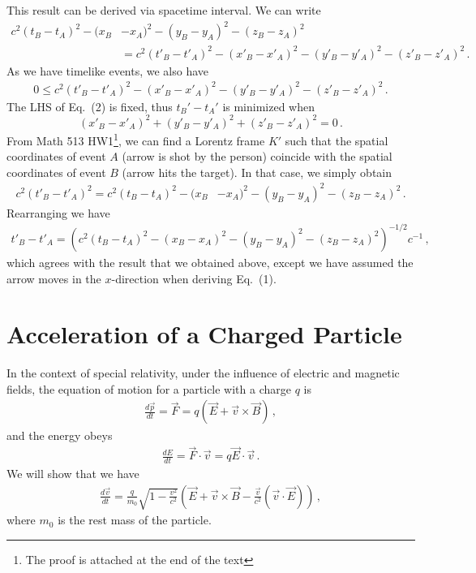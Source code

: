 \documentclass[11pt, onesided]{book}
\theoremstyle{break}
\theoremstyle{break}
\begin{document}
This result can be derived via spacetime interval. We can write
\begin{align*}
c^2(t_B-t_A)^2 - (x_B&-x_A)^2 - (y_B-y_A)^2 - (z_B-z_A)^2 \\
&= 
c^2(t'_B-t'_A)^2 - (x'_B-x'_A)^2 - (y'_B-y'_A)^2 - (z'_B-z'_A)^2\,. \tag{2}
\end{align*}
\setcounter{equation}{2}
As we have timelike events, we also have
\begin{align*}
0 \leq c^2(t'_B-t'_A)^2 - (x'_B-x'_A)^2 - (y'_B-y'_A)^2 - (z'_B-z'_A)^2\,.
\end{align*}
The LHS of Eq.\ (2) is fixed, thus $t_B' - t_A'$ is minimized when 
$$(x'_B-x'_A)^2 +(y'_B-y'_A)^2 +(z'_B-z'_A)^2 = 0\,.$$
From Math 513 HW1\footnote{The proof is attached at the end of the text}, we can find a Lorentz frame $K'$ such that the spatial coordinates of event $A$ (arrow is shot by the person) coincide with the spatial coordinates of event $B$ (arrow hits the target). In that case, we simply obtain
\begin{align*}
c^2 ( t'_B - t'_A)^2 = c^2(t_B-t_A)^2 - (x_B&-x_A)^2 - (y_B-y_A)^2 - (z_B-z_A)^2 \,.
\end{align*}
Rearranging we have
\begin{align*}
t'_B - t'_A = \left( 
c^2(t_B-t_A)^2 - (x_B-x_A)^2 - (y_B-y_A)^2 - (z_B-z_A)^2 \right)^{-1/2} c^{-1}\,,
\end{align*}
which agrees with the result that we obtained above, except we have assumed the arrow moves in the $x$-direction when deriving Eq.\ (1).

\newpage
\section{Acceleration of a Charged Particle}
In the context of special relativity, under the influence of electric and magnetic fields, the equation of motion for a particle with a charge $q$ is
\begin{align*}
\frac{d\vec{p}}{dt} = \vec{F} = q\left(\vec{E} + \vec{v}\times \vec{B}\right)\,,
\end{align*}
and the energy obeys
\begin{align*}
\frac{dE}{dt} = \vec{F}\cdot \vec{v} = q\vec{E}\cdot \vec{v}\,.
\end{align*}
We will show that we have
\begin{align*}
\frac{d\vec{v}}{dt} = \frac{q}{m_0}\sqrt{1 - \frac{v^2}{c^2}}\left( \vec{E} + \vec{v}\times \vec{B} - \frac{\vec{v}}{c^2}\left( \vec{v}\cdot \vec{E}\right) \right)\,,
\end{align*}
where $m_0$ is the rest mass of the particle.\\
\end{document}
